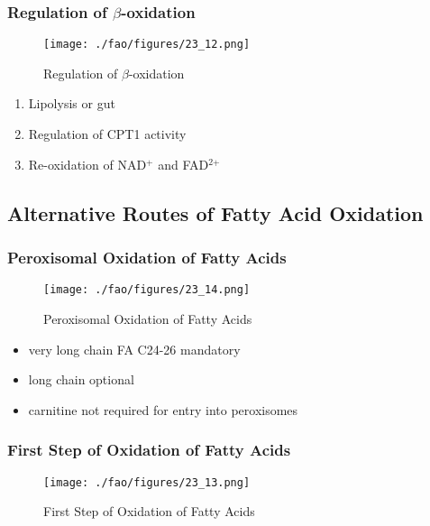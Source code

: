 \documentclass{scrartcl}
\begin{document}
\subsubsection{Regulation of \(\beta\)-oxidation}
\label{sec:org832bd01}
\begin{figure}[htbp]
\centering
\texttt{[image: ./fao/figures/23\_12.png]}
\caption{\label{fig:org4062d52}
Regulation of \(\beta\)-oxidation}
\end{figure}

\begin{enumerate}
\item Lipolysis or gut
\item Regulation of CPT1 activity
\item Re-oxidation of NAD\(^{\text{+}}\) and FAD\(^{\text{2+}}\)
\end{enumerate}

\subsection{Alternative Routes of Fatty Acid Oxidation}
\label{sec:org4bb0394}

\subsubsection{Peroxisomal Oxidation of Fatty Acids}
\label{sec:org964f771}

\begin{figure}[htbp]
\centering
\texttt{[image: ./fao/figures/23\_14.png]}
\caption{\label{fig:orga8b69f8}
Peroxisomal Oxidation of Fatty Acids}
\end{figure}

\begin{itemize}
\item very long chain FA C24-26 mandatory
\item long chain optional
\item carnitine not required for entry into peroxisomes
\end{itemize}

\subsubsection{First Step of Oxidation of Fatty Acids}
\label{sec:org7e4dd35}
\begin{figure}[htbp]
\centering
\texttt{[image: ./fao/figures/23\_13.png]}
\caption{\label{fig:org8059819}
First Step of Oxidation of Fatty Acids}
\end{figure}
\end{document}
